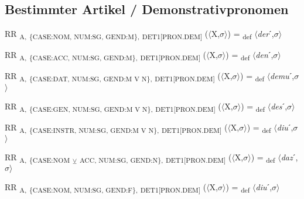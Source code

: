 {\subsection{Bestimmter Artikel / Demonstrativpronomen}

\begin{exe}
 RR \textsubscript{A,} \textsubscript{\{CASE:NOM, NUM:SG, GEND:M\},} \textsubscript{DET1[PRON.DEM]} ($\langle$X,$\sigma $$\rangle$) = \textsubscript{def} $\langle$\textit{der}ˊ,$\sigma $$\rangle$
\end{exe}

\begin{exe}
 RR \textsubscript{A,} \textsubscript{\{CASE:ACC, NUM:SG, GEND:M\},} \textsubscript{DET1[PRON.DEM]} ($\langle$X,$\sigma $$\rangle$) = \textsubscript{def} $\langle$\textit{den}ˊ,$\sigma $$\rangle$
\end{exe}

\begin{exe}
 RR \textsubscript{A,} \textsubscript{\{CASE:DAT, NUM:SG, GEND:M V N\},} \textsubscript{DET1[PRON.DEM]} ($\langle$X,$\sigma $$\rangle$) = \textsubscript{def} $\langle$\textit{demu}ˊ,$\sigma $$\rangle$
\end{exe}

\begin{exe}
 RR \textsubscript{A,} \textsubscript{\{CASE:GEN, NUM:SG, GEND:M V N\},} \textsubscript{DET1[PRON.DEM]} ($\langle$X,$\sigma $$\rangle$) = \textsubscript{def} $\langle$\textit{des}ˊ,$\sigma $$\rangle$
\end{exe}

\begin{exe}
 RR \textsubscript{A,} \textsubscript{\{CASE:INSTR, NUM:SG, GEND:M V N\},} \textsubscript{DET1[PRON.DEM]} ($\langle$X,$\sigma $$\rangle$) = \textsubscript{def} $\langle$\textit{diu}ˊ,$\sigma $$\rangle$
\end{exe}

\begin{exe}
 RR \textsubscript{A,} \textsubscript{\{CASE:NOM} \textsubscript{${\veebar}$}\textsubscript{ ACC, NUM:SG, GEND:N\},} \textsubscript{DET1[PRON.DEM]} ($\langle$X,$\sigma $$\rangle$) = \textsubscript{def} $\langle$\textit{daz}ˊ,$\sigma $$\rangle$
\end{exe}

\begin{exe}
 RR \textsubscript{A,} \textsubscript{\{CASE:NOM, NUM:SG, GEND:F\},} \textsubscript{DET1[PRON.DEM]} ($\langle$X,$\sigma $$\rangle$) = \textsubscript{def} $\langle$\textit{diu}ˊ,$\sigma $$\rangle$
\end{exe}

}
